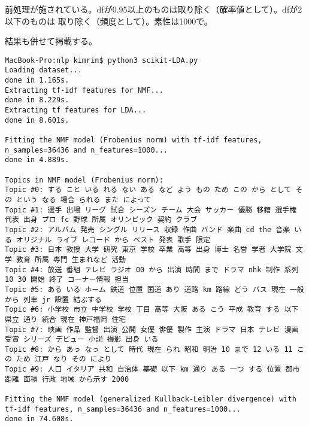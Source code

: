 \documentclass[uplatex]{jsarticle}
\begin{document}
前処理が施されている。dfが0.95以上のものは取り除く（確率値として）。dfが2以下のものは
取り除く（頻度として）。素性は1000で。

結果も併せて掲載する。

\begin{verbatim}
MacBook-Pro:nlp kimrin$ python3 scikit-LDA.py
Loading dataset...
done in 1.165s.
Extracting tf-idf features for NMF...
done in 8.229s.
Extracting tf features for LDA...
done in 8.601s.

Fitting the NMF model (Frobenius norm) with tf-idf features, n_samples=36436 and n_features=1000...
done in 4.889s.

Topics in NMF model (Frobenius norm):
Topic #0: する こと いる れる ない ある など よう もの ため この から として その という なる 場合 られる また によって
Topic #1: 選手 出場 リーグ 試合 シーズン チーム 大会 サッカー 優勝 移籍 選手権 代表 出身 プロ fc 野球 所属 オリンピック 契約 クラブ
Topic #2: アルバム 発売 シングル リリース 収録 作曲 バンド 楽曲 cd the 音楽 いる オリジナル ライブ レコード から ベスト 発表 歌手 限定
Topic #3: 日本 教授 大学 研究 東京 学校 卒業 高等 出身 博士 名誉 学者 大学院 文学 教育 所属 専門 生まれなど 活動
Topic #4: 放送 番組 テレビ ラジオ 00 から 出演 時間 まで ドラマ nhk 制作 系列 10 30 開始 終了 コーナー情報 担当
Topic #5: ある いる ホーム 鉄道 位置 国道 あり 道路 km 路線 どう バス 現在 一般 から 列車 jr 設置 結ぶする
Topic #6: 小学校 市立 中学校 学校 丁目 高等 大阪 ある こう 平成 教育 する 以下 県立 通り 統合 現在 神戸福岡 住宅
Topic #7: 映画 作品 監督 出演 公開 女優 俳優 製作 主演 ドラマ 日本 テレビ 漫画 受賞 シリーズ デビュー 小説 撮影 出身 いる
Topic #8: から あっ なっ として 時代 現在 られ 昭和 明治 10 まで 12 いる 11 この ため 江戸 なり その により
Topic #9: 人口 イタリア 共和 自治体 基礎 以下 km 通り ある 一つ する 位置 都市 距離 面積 行政 地域 から示す 2000

Fitting the NMF model (generalized Kullback-Leibler divergence) with tf-idf features, n_samples=36436 and n_features=1000...
done in 74.608s.


\end{verbatim}
\end{document}
